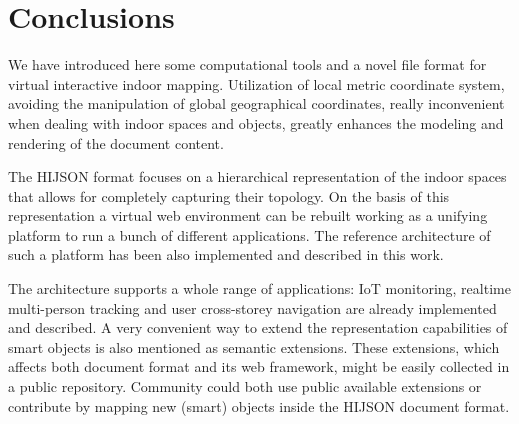\section{Conclusions}\label{conclusions}

We have introduced here some computational tools and a novel file format 
for virtual interactive indoor mapping.
Utilization of local metric coordinate system,
avoiding the manipulation of global geographical coordinates, really inconvenient when
dealing with indoor spaces and objects, greatly enhances the modeling and rendering
of the document content. 

The HIJSON format focuses on a hierarchical representation of the indoor
spaces that allows for completely capturing their topology. On the basis of
this representation a virtual web environment can be rebuilt working as a
unifying platform to run a bunch of different applications. The reference
architecture of such a platform has been also implemented and described in
this work. 

The architecture supports a whole range of applications: IoT monitoring,
realtime multi-person tracking and user cross-storey navigation are already
implemented and described. A very convenient way to extend the representation
capabilities of smart objects is also mentioned as semantic extensions. These
extensions, which affects both document format and its web framework, might be
easily collected in a public repository. Community could both use public
available extensions or contribute by mapping new (smart) objects inside the
HIJSON document format.
